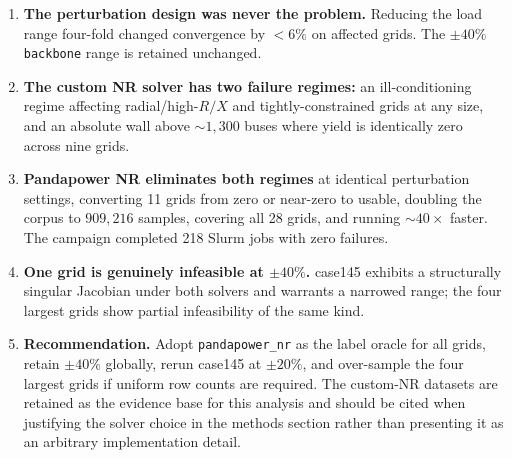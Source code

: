 \documentclass{article}
\begin{document}
\begin{enumerate}[leftmargin=*]
\item \textbf{The perturbation design was never the problem.}  Reducing the
  load range four-fold changed convergence by ${<}6\%$ on affected grids.
  The $\pm40\%$ \texttt{backbone} range is retained unchanged.

\item \textbf{The custom NR solver has two failure regimes:} an
  ill-conditioning regime affecting radial/high-$R/X$ and tightly-constrained
  grids at any size, and an absolute wall above ${\sim}1{,}300$ buses where
  yield is identically zero across nine grids.

\item \textbf{Pandapower NR eliminates both regimes} at identical
  perturbation settings, converting 11 grids from zero or near-zero to
  usable, doubling the corpus to $909{,}216$ samples, covering all 28 grids,
  and running ${\sim}40\times$ faster.  The campaign completed 218 Slurm jobs
  with zero failures.

\item \textbf{One grid is genuinely infeasible at $\pm40\%$.}  case145
  exhibits a structurally singular Jacobian under both solvers and warrants a
  narrowed range; the four largest grids show partial infeasibility of the
  same kind.

\item \textbf{Recommendation.}  Adopt \texttt{pandapower\_nr} as the label
  oracle for all grids, retain $\pm40\%$ globally, rerun case145 at $\pm20\%$,
  and over-sample the four largest grids if uniform row counts are required.
  The custom-NR datasets are retained as the evidence base for this analysis
  and should be cited when justifying the solver choice in the methods
  section rather than presenting it as an arbitrary implementation detail.
\end{enumerate}
\end{document}
